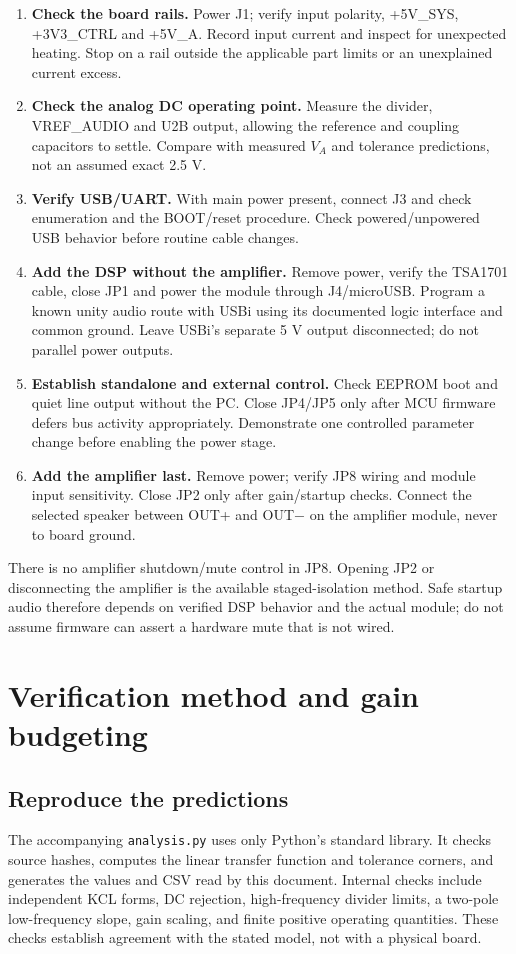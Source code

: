 \documentclass[a4paper,10pt]{article}
\newcommand{\nextsection}[1]{\clearpage\section{#1}}
\newcommand{\net}[1]{\texttt{#1}}
\begin{document}
\begin{enumerate}
\item \textbf{Check the board rails.} Power J1; verify input polarity, +5V\_SYS, +3V3\_CTRL and +5V\_A. Record input current and inspect for unexpected heating. Stop on a rail outside the applicable part limits or an unexplained current excess.
\item \textbf{Check the analog DC operating point.} Measure the divider, VREF\_AUDIO and U2B output, allowing the reference and coupling capacitors to settle. Compare with measured $V_A$ and tolerance predictions, not an assumed exact 2.5 V.
\item \textbf{Verify USB/UART.} With main power present, connect J3 and check enumeration and the BOOT/reset procedure. Check powered/unpowered USB behavior before routine cable changes.
\item \textbf{Add the DSP without the amplifier.} Remove power, verify the TSA1701 cable, close JP1 and power the module through J4/microUSB. Program a known unity audio route with USBi using its documented logic interface and common ground. Leave USBi's separate 5 V output disconnected; do not parallel power outputs.
\item \textbf{Establish standalone and external control.} Check EEPROM boot and quiet line output without the PC. Close JP4/JP5 only after MCU firmware defers bus activity appropriately. Demonstrate one controlled parameter change before enabling the power stage.
\item \textbf{Add the amplifier last.} Remove power; verify JP8 wiring and module input sensitivity. Close JP2 only after gain/startup checks. Connect the selected speaker between OUT+ and OUT$-$ on the amplifier module, never to board ground.
\end{enumerate}

There is no amplifier shutdown/mute control in JP8. Opening JP2 or disconnecting the amplifier is the available staged-isolation method. Safe startup audio therefore depends on verified DSP behavior and the actual module; do not assume firmware can assert a hardware mute that is not wired.

\nextsection{Verification method and gain budgeting}
\label{sec:verification}
\subsection{Reproduce the predictions}
The accompanying \net{analysis.py} uses only Python's standard library. It checks source hashes, computes the linear transfer function and tolerance corners, and generates the values and CSV read by this document. Internal checks include independent KCL forms, DC rejection, high-frequency divider limits, a two-pole low-frequency slope, gain scaling, and finite positive operating quantities. These checks establish agreement with the stated model, not with a physical board.
\end{document}
